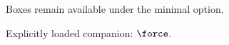 \documentclass[minimal]{otbook}
\begin{document}

\begin{definitionbox}Boxes remain available under the minimal option.\end{definitionbox}

Explicitly loaded companion: $\force$.
\end{document}
